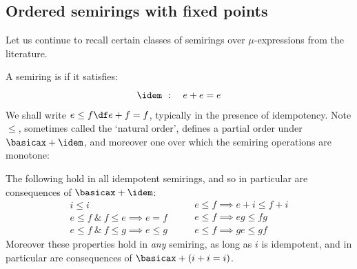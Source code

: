 \documentclass[runningheads]{amsart}
\begin{document}
\subsection{Ordered semirings with fixed points}
Let us continue to recall certain classes of semirings over $\mu$-expressions from the literature.

    A semiring is  if it satisfies:
    \[
    \idem\ : \quad  e + e = e
    \]
We shall write $e\leq f \df e+f = f$,
typically in the presence of idempotency.
Note $\leq$, sometimes called the `natural order', defines a partial order under $\basicax + \idem$, and moreover one over which the semiring operations are monotone:

\begin{proposition}
\label{props-of-nat-order}
    The following hold in all idempotent semirings, and so in particular are consequences of $\basicax + \idem$:
\begin{equation}
    \label{eq:mon-po}
    \begin{array}{c}
     i\leq i \\
     e \leq f \  \& \ f \leq e \implies e = f \\
     e \leq f \ \& \  f \leq g \implies e \leq g
\end{array}
\qquad
\begin{array}{l}
e\leq f \implies e+i \leq f+i \\ 
e\leq f \implies eg \leq fg \\
e \leq f \implies ge \leq gf
\end{array}
\end{equation}
Moreover these properties hold in \emph{any} semiring, as long as $i$ is idempotent, and in particular are consequences of $\basicax + (i+i=i)$.
\end{proposition}
\end{document}
